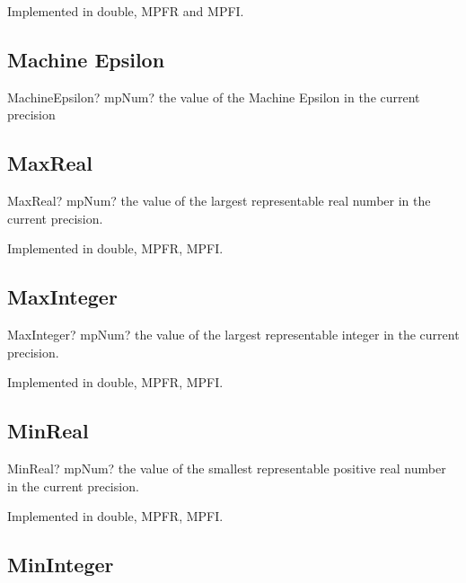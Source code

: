 Implemented in double, MPFR and MPFI.



\subsection{Machine Epsilon}

\begin{mpFunctionsExtract}
	\mpFunctionZero
	{MachineEpsilon? mpNum? the value of the Machine Epsilon in the current precision}
\end{mpFunctionsExtract}



\subsection{MaxReal}

\begin{mpFunctionsExtract}
	\mpFunctionZero
	{MaxReal? mpNum? the value of the largest representable real number in the current precision.}
\end{mpFunctionsExtract}


Implemented in double, MPFR, MPFI.



\subsection{MaxInteger}

\begin{mpFunctionsExtract}
	\mpFunctionZero
	{MaxInteger? mpNum? the value of the largest representable integer in the current precision.}
\end{mpFunctionsExtract}


Implemented in double, MPFR, MPFI.



\subsection{MinReal}

\begin{mpFunctionsExtract}
	\mpFunctionZero
	{MinReal? mpNum? the value of the smallest representable positive real number in the current precision.}
\end{mpFunctionsExtract}

Implemented in double, MPFR, MPFI.


\subsection{MinInteger}

